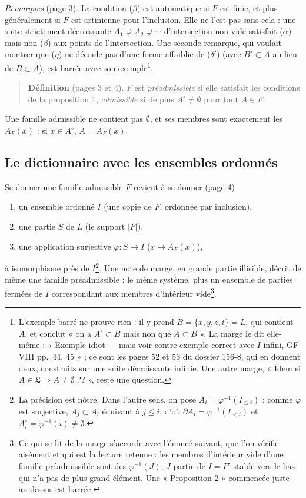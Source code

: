 \documentclass[11pt,a4paper]{article}
\begin{document}
\emph{Remarques} (page 3). La condition ($\beta$) est automatique si $F$ est
finie, et plus généralement si $F$ est artinienne pour l'inclusion. Elle ne
l'est pas sans cela : une suite strictement décroissante $A_{1} \supsetneq
A_{2} \supsetneq \cdots$ d'intersection non vide satisfait ($\alpha$) mais non
($\beta$) aux points de l'intersection. Une seconde remarque, qui voulait
montrer que ($\eta$) ne découle pas d'une forme affaiblie de ($\delta'$) (avec
$B^{\circ} \subset A$ au lieu de $B \subset A$), est barrée avec son
exemple\footnote{L'exemple barré ne prouve rien : il y prend $B = \{x, y, z,
t\} = L$, qui contient $A$, et conclut « on a $A^{\circ} \subset B$ mais non
que $A \subset B$ ». La marge le dit elle-même : « Exemple idiot --- mais voir
contre-exemple correct avec $I$ infini, GF VIII pp.~44, 45 » ; ce sont les
pages 52 et 53 du dossier 156-8, qui en donnent deux, construits sur une suite
décroissante infinie. Une autre marge, « Idem si $A \in \mathfrak{L} \Rightarrow
A \neq \emptyset$ ?? », reste une question.}.

\begin{quote}
\textbf{Définition} (pages 3 et 4). $F$ est \emph{préadmissible} si elle
satisfait les conditions de la proposition 1, \emph{admissible} si de plus
$A^{\circ} \neq \emptyset$ pour tout $A \in F$.
\end{quote}

Une famille admissible ne contient pas $\emptyset$, et ses membres sont
exactement les $A_{F}(x)$ : si $x \in A^{\circ}$, $A = A_{F}(x)$.

\subsection*{Le dictionnaire avec les ensembles ordonnés}

Se donner une famille admissible $F$ revient à se donner (page 4)
\begin{enumerate}
\item[a)] un ensemble ordonné $I$ (une copie de $F$, ordonnée par inclusion),
\item[b)] une partie $S$ de $L$ (le support $|F|$),
\item[c)] une application surjective $\varphi : S \to I$ ($x \mapsto
A_{F}(x)$),
\end{enumerate}
à isomorphisme près de $I$\footnote{La précision est nôtre. Dans l'autre
sens, on pose $A_{i} = \varphi^{-1}(I_{\leq i})$ ; comme $\varphi$ est
surjective, $A_{j} \subset A_{i}$ équivaut à $j \leq i$, d'où $\partial A_{i} =
\varphi^{-1}(I_{<i})$ et $A_{i}^{\circ} = \varphi^{-1}(i) \neq \emptyset$.}.
Une note de marge, en grande partie illisible, décrit de même une famille
préadmissible : le même système, plus un ensemble de parties fermées de $I$
correspondant aux membres d'intérieur vide\footnote{Ce qui se lit de la marge
s'accorde avec l'énoncé suivant, que l'on vérifie aisément et qui est la
lecture retenue : les membres d'intérieur vide d'une famille préadmissible
sont des $\varphi^{-1}(J)$, $J$ partie de $I = F'$ stable vers le bas qui n'a
pas de plus grand élément. Une « Proposition 2 » commencée juste au-dessus est
barrée.}.
\end{document}
